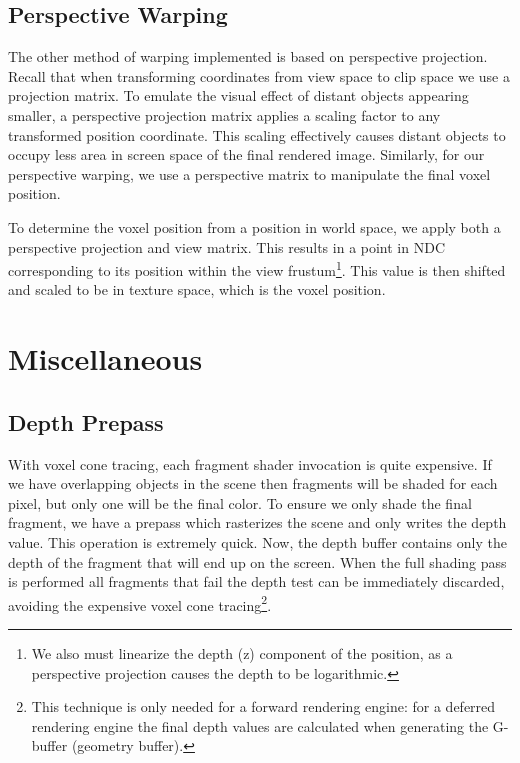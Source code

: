 

\subsection{Perspective Warping}
The other method of warping implemented is based on perspective projection. Recall that when transforming coordinates from view space to clip space we use a projection matrix. To emulate the visual effect of distant objects appearing smaller, a perspective projection matrix applies a scaling factor to any transformed position coordinate. This scaling effectively causes distant objects to occupy less area in screen space of the final rendered image. Similarly, for our perspective warping, we use a perspective matrix to manipulate the final voxel position.

To determine the voxel position from a position in world space, we apply both a perspective projection and view matrix. This results in a point in NDC corresponding to its position within the view frustum\footnote{We also must linearize the depth (z) component of the position, as a perspective projection causes the depth to be logarithmic.}. This value is then shifted and scaled to be in texture space, which is the voxel position.


\section{Miscellaneous}
\subsection{Depth Prepass}
With voxel cone tracing, each fragment shader invocation is quite expensive. If we have overlapping objects in the scene then fragments will be shaded for each pixel, but only one will be the final color. To ensure we only shade the final fragment, we have a prepass which rasterizes the scene and only writes the depth value. This operation is extremely quick. Now, the depth buffer contains only the depth of the fragment that will end up on the screen. When the full shading pass is performed all fragments that fail the depth test can be immediately discarded, avoiding the expensive voxel cone tracing\footnote{This technique is only needed for a forward rendering engine: for a deferred rendering engine the final depth values are calculated when generating the G-buffer (geometry buffer).}.


